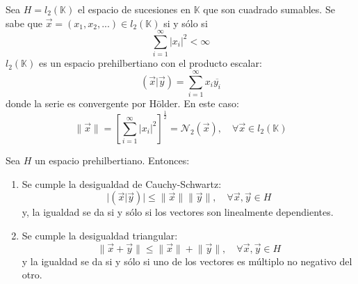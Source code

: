 \documentclass[12pt]{report}
\theoremstyle{largebreak}
\newcommand\abs[1]{\ensuremath{\big|#1\big|}}
\newcommand\norm[1]{\ensuremath{\|#1\|}}
\newcommand\ora[1]{\ensuremath{\vec{#1}}}
\newcommand\pint[2]{\ensuremath{\left(#1\big| #2\right)}}
\newcommand\conj[1]{\ensuremath{\overline{#1}}}
\begin{document}
    \begin{exa}
        Sea $H=l_2(\mathbb{K})$ el espacio de sucesiones en $\mathbb{K}$ que son cuadrado sumables. Se sabe que $\ora{x}=(x_1,x_2,...)\in l_2(\mathbb{K})$ si y sólo si
        \begin{equation*}
            \sum_{i=1}^{\infty}|x_i|^2<\infty
        \end{equation*}
        $l_2(\mathbb{K})$ es un espacio prehilbertiano con el producto escalar:
        \begin{equation*}
            \pint{\ora{x}}{\ora{y}}=\sum_{i=1}^{\infty}x_i\conj{y_i}
        \end{equation*}
        donde la serie es convergente por Hölder. En este caso:
        \begin{equation*}
            \norm{\ora{x}}=\left[\sum_{i=1}^{\infty}\abs{x_i}^2\right]^{\frac{1}{2}}=\mathcal{N}_2(\ora{x}),\quad\forall\ora{x}\in l_2(\mathbb{K})
        \end{equation*}
    \end{exa}

    \begin{theor}
        Sea $H$ un espacio prehilbertiano. Entonces:
        \begin{enumerate}
            \item Se cumple la desigualdad de Cauchy-Schwartz:
            \begin{equation*}
                \abs{\pint{\vec{x}}{\vec{y}}}\leq \norm{\vec{x}}\norm{\vec{y}}, \quad\forall\vec{x},\vec{y}\in H
            \end{equation*}
            y, la igualdad se da si y sólo si los vectores son linealmente dependientes.
            \item Se cumple la desigualdad triangular:
            \begin{equation*}
                \norm{\vec{x}+\vec{y}}\leq\norm{\vec{x}}+\norm{\vec{y}},\quad\forall\vec{x},\vec{y}\in H
            \end{equation*}
            y la igualdad se da si y sólo si uno de los vectores es múltiplo no negativo del otro.
        \end{enumerate}
    \end{theor}
\end{document}
